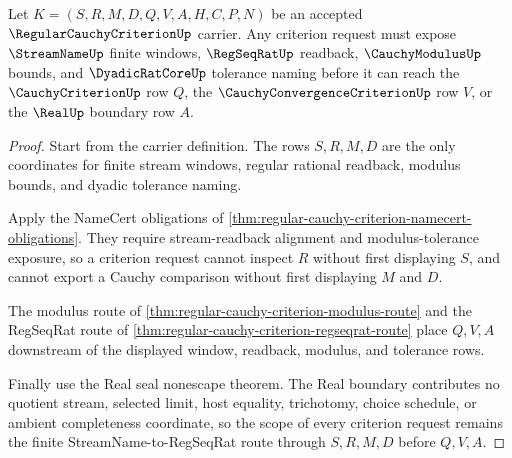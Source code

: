 \begin{theorem}
\label{thm:regular-cauchy-criterion-streamname-regseqrat-scope}
Let $K=(S,R,M,D,Q,V,A,H,C,P,N)$ be an accepted $\RegularCauchyCriterionUp$ carrier. Any criterion request must expose $\StreamNameUp$ finite windows, $\RegSeqRatUp$ readback, $\CauchyModulusUp$ bounds, and $\DyadicRatCoreUp$ tolerance naming before it can reach the $\CauchyCriterionUp$ row $Q$, the $\CauchyConvergenceCriterionUp$ row $V$, or the $\RealUp$ boundary row $A$.
\end{theorem}
\begin{proof}
Start from the carrier definition. The rows $S,R,M,D$ are the only coordinates for finite stream windows, regular rational readback, modulus bounds, and dyadic tolerance naming.

Apply the NameCert obligations of \autoref{thm:regular-cauchy-criterion-namecert-obligations}. They require stream-readback alignment and modulus-tolerance exposure, so a criterion request cannot inspect $R$ without first displaying $S$, and cannot export a Cauchy comparison without first displaying $M$ and $D$.

The modulus route of \autoref{thm:regular-cauchy-criterion-modulus-route} and the RegSeqRat route of \autoref{thm:regular-cauchy-criterion-regseqrat-route} place $Q,V,A$ downstream of the displayed window, readback, modulus, and tolerance rows.

Finally use the Real seal nonescape theorem. The Real boundary contributes no quotient stream, selected limit, host equality, trichotomy, choice schedule, or ambient completeness coordinate, so the scope of every criterion request remains the finite StreamName-to-RegSeqRat route through $S,R,M,D$ before $Q,V,A$.
\end{proof}

